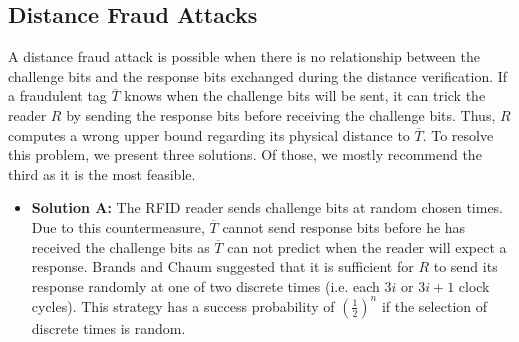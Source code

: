 \documentclass{article}
\begin{document}
\subsection{Distance Fraud Attacks}\label{sec::dfsolution}
 A distance fraud attack is possible when there is no relationship between the challenge bits and the response bits exchanged during the distance verification.  If a fraudulent tag $\overline{T}$ knows when the challenge bits  will be sent,  it can trick the reader $R$ by sending the response bits before receiving the challenge bits.  Thus, $R$ computes a wrong upper bound regarding its physical distance to $\overline{T}$. To resolve this problem, we present three solutions. Of those, we mostly recommend the third as it is the most feasible.

\begin{itemize}
\item \textbf{Solution A:} The RFID reader sends challenge bits at random chosen times.  Due to this countermeasure, $\overline{T}$ cannot send response bits before he has received the challenge bits as $\overline{T}$ can not predict when the reader will expect a response. Brands and Chaum \cite{brands94} suggested that  it is sufficient for $R$  to send its response randomly at one of two discrete times (i.e. each $3i$ or $3i+1$ clock cycles). This strategy has a success probability of $(\frac{1}{2})^n$ if the selection of discrete times is random.


\end{itemize}
\end{document}
